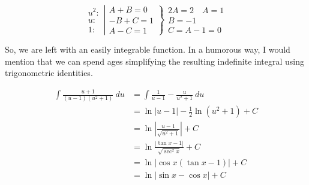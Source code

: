 \documentclass{article}
\begin{document}
\[\left.\begin{aligned}u^2:\\u:\\1:\end{aligned}\right|\left.\begin{aligned}A+B=0\\-B+C=1\\A-C=1\end{aligned}\right\}\begin{aligned}2A=2\quad\boxed{A=1}\\\boxed{B=-1}\\\boxed{C=A-1=0}\end{aligned}\]

\vspace{10pt}

So, we are left with an easily integrable function. In a humorous way, I would mention that we can spend ages simplifying the resulting indefinite integral using trigonometric identities.

\begin{align*}
\int\frac{u+1}{(u-1)(u^2+1)}\ du&=\int\frac{1}{u-1}-\frac{u}{u^2+1}\ du\\
&=\ln|u-1|-\frac{1}{2}\ln(u^2+1)+C\\
&=\ln\left|\frac{u-1}{\sqrt{u^2+1}}\right|+C\\
&=\ln\frac{|\tan x-1|}{\sqrt{\sec^2x}}+C\\
&=\ln|\cos x(\tan x-1)|+C\\
&=\ln|\sin x-\cos x|+C
\end{align*}
\end{document}
